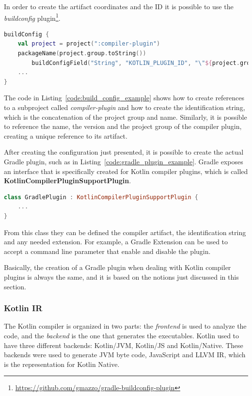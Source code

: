 In order to create the artifact coordinates and the ID it is possible to use the \textit{buildconfig} plugin\footnote{\url{https://github.com/gmazzo/gradle-buildconfig-plugin}}.
\begin{lstlisting}[caption={Example of a \textit{buildconfig} that creates the compiler plugin artifact}, language=Kotlin, captionpos=b, label={code:build_config_example}]
buildConfig {
    val project = project(":compiler-plugin")
    packageName(project.group.toString())
        buildConfigField("String", "KOTLIN_PLUGIN_ID", "\"${project.group}.${project.name}\"")
    ...
}
\end{lstlisting}
The code in Listing~\ref{code:build_config_example} shows how to create references to a subproject called \textit{compiler-plugin} and how to create the identification string, which is the concatenation of the project group and name. Similarly, it is possible to reference the name, the version and the project group of the compiler plugin, creating a unique reference to its artifact.

After creating the configuration just presented, it is possible to create the actual Gradle plugin, such as in Listing~\ref{code:gradle_plugin_example}. Gradle exposes an interface that is specifically created for Kotlin compiler plugins, which is called \textbf{KotlinCompilerPluginSupportPlugin}.
\begin{lstlisting}[caption={Gradle plugin class example}, language=Kotlin, captionpos=b, label={code:gradle_plugin_example}]
class GradlePlugin : KotlinCompilerPluginSupportPlugin {
    ...
}
\end{lstlisting}
From this class they can be defined the compiler artifact, the identification string and any needed extension. For example, a Gradle Extension can be used to accept a command line parameter that enable and disable the plugin.

Basically, the creation of a Gradle plugin when dealing with Kotlin compiler plugins is always the same, and it is based on the notions just discussed in this section.

\subsubsection{Kotlin IR}\label{section:kotlin_ir}
The Kotlin compiler is organized in two parts: the \textit{frontend} is used to analyze the code, and the \textit{backend} is the one that generates the executables.\newline
Kotlin used to have three different backends: Kotlin/JVM, Kotlin/JS and Kotlin/Native. These backends were used to generate JVM byte code, JavaScript and LLVM IR, which is the representation for Kotlin Native.

